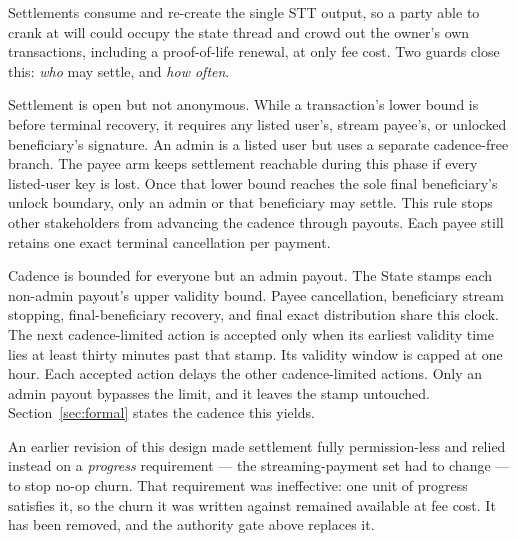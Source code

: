 \documentclass[11pt,DIV=11,parskip=half-]{scrartcl}
\begin{document}
Settlements consume and re-create the single STT output, so a party able to crank at will could occupy the state thread and crowd out the owner's own transactions, including a proof-of-life renewal, at only fee cost. Two guards close this: \emph{who} may settle, and \emph{how often}.

Settlement is open but not anonymous. While a transaction's lower bound is before terminal recovery, it requires any listed user's, stream payee's, or unlocked beneficiary's signature. An admin is a listed user but uses a separate cadence-free branch. The payee arm keeps settlement reachable during this phase if every listed-user key is lost. Once that lower bound reaches the sole final beneficiary's unlock boundary, only an admin or that beneficiary may settle. This rule stops other stakeholders from advancing the cadence through payouts. Each payee still retains one exact terminal cancellation per payment.

Cadence is bounded for everyone but an admin payout. The State stamps each non-admin payout's upper validity bound. Payee cancellation, beneficiary stream stopping, final-beneficiary recovery, and final exact distribution share this clock. The next cadence-limited action is accepted only when its earliest validity time lies at least thirty minutes past that stamp. Its validity window is capped at one hour. Each accepted action delays the other cadence-limited actions. Only an admin payout bypasses the limit, and it leaves the stamp untouched. Section~\ref{sec:formal} states the cadence this yields.

An earlier revision of this design made settlement fully permission-less and relied instead on a \emph{progress} requirement --- the streaming-payment set had to change --- to stop no-op churn. That requirement was ineffective: one unit of progress satisfies it, so the churn it was written against remained available at fee cost. It has been removed, and the authority gate above replaces it.
\end{document}
